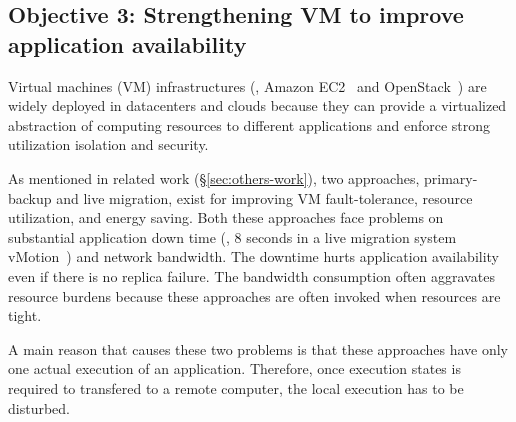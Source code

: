 \vspace{-.15in}\subsection{Objective 3: Strengthening VM to improve application 
availability}\label{sec:vm}\vspace{-.075in}




Virtual machines (VM) infrastructures (\eg, Amazon EC2~\cite{amazon:vpc} and 
OpenStack~\cite{openstack}) are widely deployed in datacenters and clouds 
because they can provide a virtualized abstraction of computing resources to 
different applications and enforce strong utilization isolation and security. 

As mentioned in related work (\S\ref{sec:others-work}), two approaches, 
primary-backup and live migration, exist for improving VM fault-tolerance, 
resource utilization, and energy saving. Both these approaches face problems on 
substantial application down time (\eg, 8 seconds in a live migration system 
vMotion~\cite{vmotion:atc05}) and network bandwidth. The downtime hurts 
application availability even if there is no replica failure. The bandwidth 
consumption often aggravates resource burdens because these approaches are often 
invoked when resources are tight.

A main reason that causes these two problems is that these approaches have only 
one actual execution of an application. Therefore, once execution states is 
required to transfered to a remote computer, the local execution has to be 
disturbed.



% 




